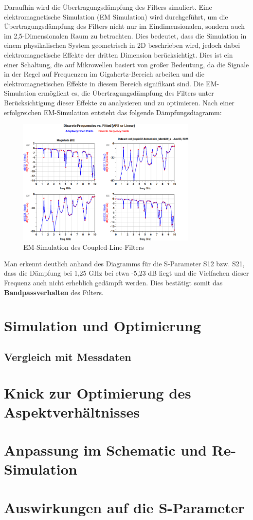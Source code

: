 Daraufhin wird die Übertragungsdämpfung des Filters simuliert. Eine elektromagnetische Simulation (EM Simulation) wird durchgeführt, um die Übertragungsdämpfung des Filters nicht nur im Eindimensionalen, sondern auch im 2,5-Dimensionalen Raum zu betrachten. 
Dies bedeutet, dass die Simulation in einem physikalischen System geometrisch in 2D beschrieben wird, jedoch dabei elektromagnetische Effekte der dritten Dimension berücksichtigt. 
Dies ist ein einer Schaltung, die auf Mikrowellen basiert von großer Bedeutung, da die Signale in der Regel auf Frequenzen im Gigahertz-Bereich arbeiten und die elektromagnetischen Effekte in diesem Bereich signifikant sind. 
Die EM-Simulation ermöglicht es, die Übertragungsdämpfung des Filters unter Berücksichtigung dieser Effekte zu analysieren und zu optimieren.
Nach einer erfolgreichen EM-Simulation entsteht das folgende Dämpfungsdiagramm:
\begin{figure}[H]
    \centering
    \includegraphics[width=0.8\textwidth]{Pictures/EMSimulationohneKnick.png}
    \caption{EM-Simulation des Coupled-Line-Filters}
\end{figure}

Man erkennt deutlich anhand des Diagramms für die S-Parameter S12 bzw. S21, dass die Dämpfung bei 1,25 GHz bei etwa -5,23 dB liegt und die Vielfachen dieser Frequenz auch nicht erheblich gedämpft werden. Dies bestätigt somit das \textbf{Bandpassverhalten} des Filters.

\section{Simulation und Optimierung}
    \subsection{Vergleich mit Messdaten}

\section{Knick zur Optimierung des Aspektverhältnisses}

\section{Anpassung im Schematic und Re-Simulation}

\section{Auswirkungen auf die S-Parameter}

